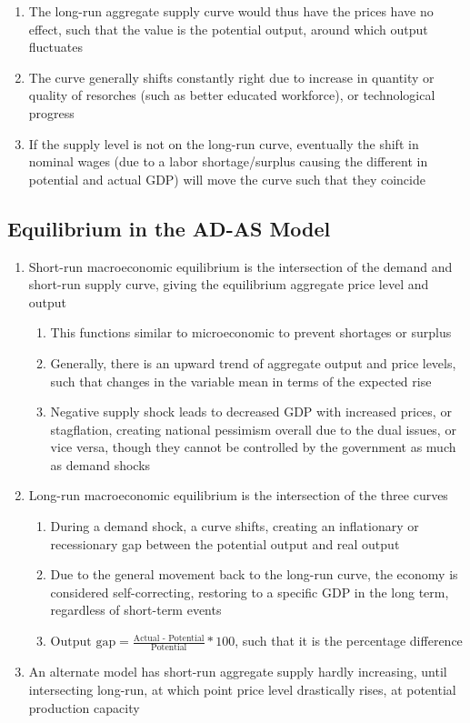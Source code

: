 \begin{enumerate}
\begin{enumerate}
\item The long-run aggregate supply curve would thus have the prices have no effect, such that the value is the potential output, around which output fluctuates
\item The curve generally shifts constantly right due to increase in quantity or quality of resorches (such as better educated workforce), or technological progress
\item If the supply level is not on the long-run curve, eventually the shift in nominal wages (due to a labor shortage/surplus causing the different in potential and actual GDP) will move the curve such that they coincide
\end{enumerate}
\end{enumerate}

\subsection{Equilibrium in the AD-AS Model}
\begin{enumerate}
\item Short-run macroeconomic equilibrium is the intersection of the demand and short-run supply curve, giving the equilibrium aggregate price level and output
\begin{enumerate}
\item This functions similar to microeconomic to prevent shortages or surplus
\item Generally, there is an upward trend of aggregate output and price levels, such that changes in the variable mean in terms of the expected rise
\item Negative supply shock leads to decreased GDP with increased prices, or stagflation, creating national pessimism overall due to the dual issues, or vice versa, though they cannot be controlled by the government as much as demand shocks 
\end{enumerate}
\item Long-run macroeconomic equilibrium is the intersection of the three curves 
\begin{enumerate}
\item During a demand shock, a curve shifts, creating an inflationary or recessionary gap between the potential output and real output
\item Due to the general movement back to the long-run curve, the economy is considered self-correcting, restoring to a specific GDP in the long term, regardless of short-term events
\item $\text{Output gap} = \frac{\text{Actual - Potential}}{\text{Potential}}*100$, such that it is the percentage difference
\end{enumerate}
\item An alternate model has short-run aggregate supply hardly increasing, until intersecting long-run, at which point price level drastically rises, at potential production capacity
\end{enumerate}

